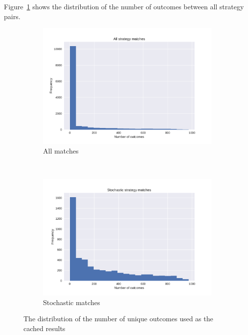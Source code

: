 \documentclass{article}
\begin{document}
Figure~\ref{fig:number_of_stochastic_match_outcomes} shows the distribution of
the number of outcomes between all strategy pairs.


\begin{figure}[!hbtp]
    \centering
    \begin{subfigure}[t]{.5\textwidth}
        \centering
        \includegraphics[width=.9\textwidth]{./img/number_of_match_outcomes.pdf}
        \caption{All matches}
    \end{subfigure}%
    ~
    \begin{subfigure}[t]{.5\textwidth}
        \centering
        \includegraphics[width=.9\textwidth]{./img/number_of_stochastic_match_outcomes.pdf}
        \caption{Stochastic matches}
    \end{subfigure}%
    \caption{The distribution of the number of unique outcomes used as the
    cached results}
    \label{fig:number_of_stochastic_match_outcomes}
\end{figure}
\end{document}
